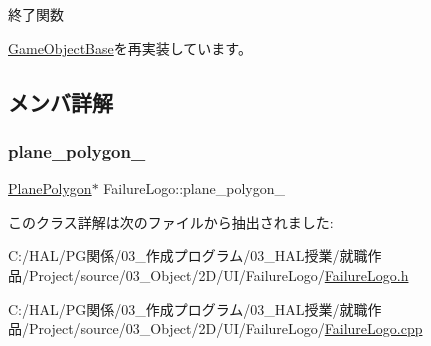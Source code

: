 終了関数 



\mbox{\hyperlink{class_game_object_base_a97e1bc277d7b1c0156d4735de29a022c}{Game\+Object\+Base}}を再実装しています。



\subsection{メンバ詳解}
\mbox{\label{class_failure_logo_ab41feac9836e9687c75546098ff8f53c}} 
\subsubsection{\texorpdfstring{plane\+\_\+polygon\+\_\+}{plane\_polygon\_}}
{\footnotesize\ttfamily \mbox{\hyperlink{class_plane_polygon}{Plane\+Polygon}}$\ast$ Failure\+Logo\+::plane\+\_\+polygon\+\_\+}



このクラス詳解は次のファイルから抽出されました\+:\begin{DoxyCompactItemize}
\item 
C\+:/\+H\+A\+L/\+P\+G関係/03\+\_\+作成プログラム/03\+\_\+\+H\+A\+L授業/就職作品/\+Project/source/03\+\_\+\+Object/2\+D/\+U\+I/\+Failure\+Logo/\mbox{\hyperlink{_failure_logo_8h}{Failure\+Logo.\+h}}\item 
C\+:/\+H\+A\+L/\+P\+G関係/03\+\_\+作成プログラム/03\+\_\+\+H\+A\+L授業/就職作品/\+Project/source/03\+\_\+\+Object/2\+D/\+U\+I/\+Failure\+Logo/\mbox{\hyperlink{_failure_logo_8cpp}{Failure\+Logo.\+cpp}}\end{DoxyCompactItemize}
